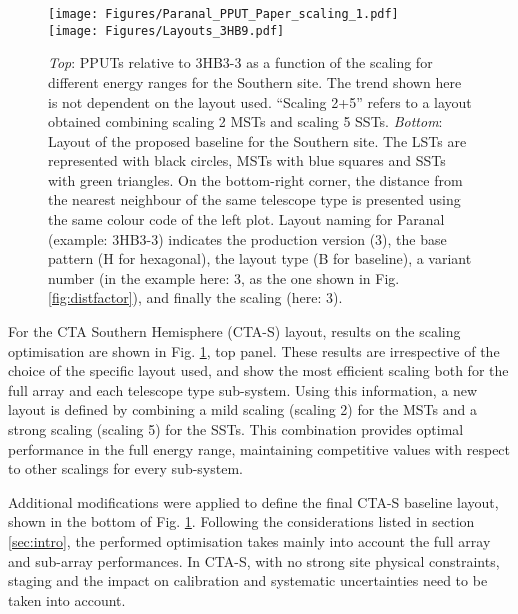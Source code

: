 \documentclass{PoS}
\begin{document}
\begin{figure}[p]
\begin{center}
\centering\texttt{[image: Figures/Paranal\_PPUT\_Paper\_scaling\_1.pdf]}\\

\centering\texttt{[image: Figures/Layouts\_3HB9.pdf]}
\caption{
\textit{Top}: PPUTs relative to 3HB3-3 as a function of the scaling for different energy ranges for the Southern site. The trend shown here is not dependent on the layout used. ``Scaling 2+5'' refers to a layout obtained combining scaling 2 MSTs and scaling 5 SSTs. \textit{Bottom}: Layout of the proposed baseline for the Southern site. The LSTs are represented with black circles, MSTs with blue squares and SSTs with green triangles. On the bottom-right corner, the distance from the nearest neighbour of the same telescope type is presented using the same colour code of the left plot. Layout naming for Paranal (example: 3HB3-3) indicates the production version (3), the base pattern (H for hexagonal), the layout type (B for baseline), a variant number (in the example here: 3, as the one shown in Fig. \protect\ref{fig:distfactor}), and finally the scaling (here: 3).}
\label{fig:3HB9Layout}
\end{center}
\end{figure}

For the CTA Southern Hemisphere (CTA-S) layout, results on the scaling optimisation are shown in Fig. \ref{fig:3HB9Layout}, top panel. These results are irrespective of the choice of the specific layout used, and show the most efficient scaling both for the full array and each telescope type sub-system. Using this information, a new layout is defined by combining a mild scaling (scaling 2) for the MSTs and a strong scaling (scaling 5) for the SSTs. This combination provides optimal performance in the full energy range, maintaining competitive values with respect to other scalings for every sub-system.

Additional modifications were applied to define the final CTA-S baseline layout, shown in the bottom of Fig. \ref{fig:3HB9Layout}. Following the considerations listed in section \ref{sec:intro}, the performed optimisation takes mainly into account the full array and sub-array performances. In CTA-S, with no strong site physical constraints, staging and the impact on calibration and systematic uncertainties need to be taken into account.
\end{document}
